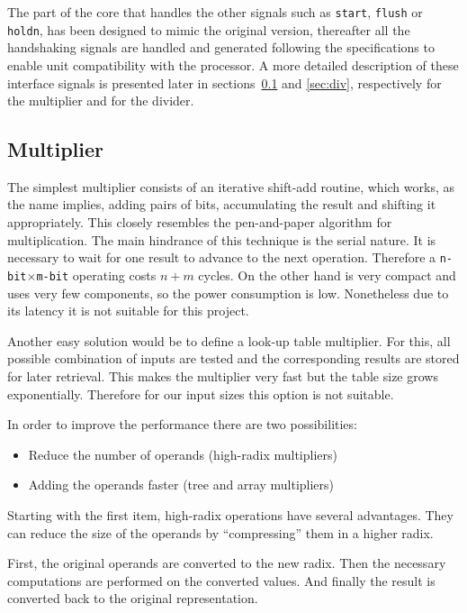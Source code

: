 The part of the core that handles the other signals such as \texttt{start}, \texttt{flush} or \texttt{holdn}, has been designed
to mimic the original version, thereafter all the handshaking signals are handled and generated following the
specifications to enable unit compatibility with the processor.
A more detailed description of these interface signals is presented later in sections~\ref{sec:mul} and \ref{sec:div}, respectively for the multiplier and for the divider.


\subsection{Multiplier}
\label{sec:mul}

The simplest multiplier consists of an iterative shift-add routine, which works, as the name implies, adding pairs of bits, accumulating the result and shifting it appropriately. This closely resembles the pen-and-paper algorithm for multiplication. The main hindrance of this technique is the serial nature. It is necessary to wait for one result to advance to the next operation. Therefore a \texttt{n-bit$\times$m-bit} operating costs $n+m$ cycles. On the other hand is very compact and uses very few components, so the power consumption is low. Nonetheless due to its latency it is not suitable for this project.

Another easy solution would be to define a look-up table multiplier. For this, all possible combination of inputs are tested and the corresponding results are stored for later retrieval. This makes the multiplier very fast but the table size grows exponentially. Therefore for our input sizes this option is not suitable.

In order to improve the performance there are two possibilities:
\begin{itemize}
\item Reduce the number of operands (\ie high-radix multipliers)
\item Adding the operands faster (\ie tree and array multipliers)
\end{itemize}

Starting with the first item, high-radix operations have several advantages.
They can reduce the size of the operands by ``compressing'' them in a higher radix.

First, the original operands are converted to the new radix. Then the necessary computations are performed on the converted values. And finally the result is converted back to the original representation.

